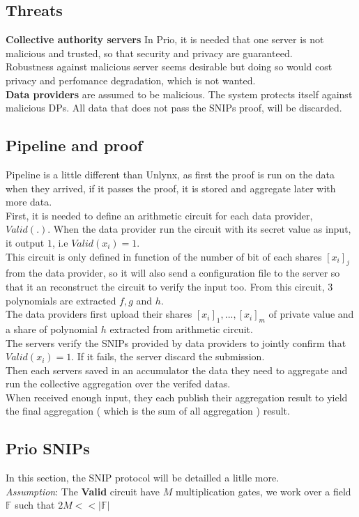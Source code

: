 \documentclass{article}
\begin{document}
\subsection{Threats}
\textbf{Collective authority servers} In Prio, it is needed that one server is not malicious and trusted, so that security and privacy are guaranteed.\\
Robustness against malicious server seems desirable but doing so would cost privacy and perfomance degradation, which is not wanted.\\
\textbf{Data providers} are assumed to be malicious. The system protects itself against malicious DPs. All data that does not pass the SNIPs proof, will be discarded.\\

\subsection{Pipeline and proof}
Pipeline is a little different than Unlynx, as first the proof is run on the data when they arrived, if it passes the proof, it is stored and aggregate later with more data.\\
First, it is needed to define an arithmetic circuit for each data provider, $Valid(.)$.
When the data provider run the circuit with its secret value as input, it output $1$, i.e $Valid(x_i)=1$.\\
This circuit is only defined in function of the number of bit of each shares $[x_i]_j$ from the data provider, so it will also send a configuration file to the server so that it an reconstruct the circuit to verify the input too. From this circuit, $3$ polynomials are extracted $f,g $ and $h$.\\

The data providers first upload their shares $[x_i]_1,...,[x_i]_m$ of private value and a share of polynomial $h$ extracted from arithmetic circuit.\\
The servers verify the SNIPs provided by data providers to jointly confirm that $Valid(x_i) = 1$. If it fails, the server discard the submission.\\
Then each servers saved in an accumulator the data they need to aggregate and run the collective aggregation over the verifed datas.\\
When received enough input, they each publish their aggregation result to yield the final aggregation ( which is the sum of all aggregation ) result.

\subsection{Prio SNIPs}
In this section, the SNIP protocol will be detailled a litlle more.\\
\textit{Assumption}: The \textbf{Valid} circuit have $M$ multiplication gates, we work over a field $\mathbb{F}$ such that $ 2M << |\mathbb{F}| $\\
\end{document}
